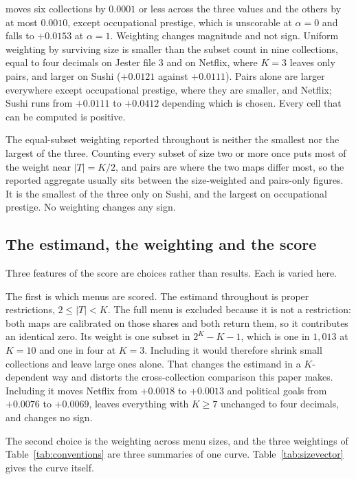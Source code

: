 \documentclass[11pt]{article}
\theoremstyle{italichead}
\begin{document}
\begin{table}[htbp]
{moves six collections by $0.0001$ or less across the three values and the others by at most
$0.0010$, except occupational prestige, which is unscorable at $\alpha = 0$ and falls to
$+0.0153$ at $\alpha = 1$. Weighting changes magnitude and not sign. Uniform weighting by
surviving size is smaller than the subset count in nine collections, equal to four decimals on
Jester file 3 and on Netflix, where $K = 3$ leaves only pairs, and larger on Sushi ($+0.0121$
against $+0.0111$). Pairs alone are larger everywhere except occupational prestige, where they
are smaller, and Netflix; Sushi runs from $+0.0111$ to $+0.0412$ depending which is chosen. Every
cell that can be computed is positive.}
\label{tab:conventions}
\end{table}

The equal-subset weighting reported throughout is neither the smallest nor the largest of the
three. Counting every subset of size two or more once puts most of the weight near
$|T| = K/2$, and pairs are where the two maps differ most, so the reported aggregate usually sits
between the size-weighted and pairs-only figures. It is the smallest of the three only on Sushi,
and the largest on occupational prestige. No weighting changes any sign.

\subsection{The estimand, the weighting and the score}
\label{sec:estimand}

Three features of the score are choices rather than results. Each is varied here.

The first is which menus are scored. The estimand throughout is proper restrictions,
$2 \le |T| < K$. The full menu is excluded because it is not a restriction: both maps are
calibrated on those shares and both return them, so it contributes an identical zero. Its weight
is one subset in $2^K - K - 1$, which is one in $1{,}013$ at $K = 10$ and one in four at $K = 3$.
Including it would therefore shrink small collections and leave large ones alone. That changes
the estimand in a $K$-dependent way and distorts the cross-collection comparison this paper
makes. Including it moves Netflix from $+0.0018$ to
$+0.0013$ and political goals from $+0.0076$ to $+0.0069$, leaves everything with $K \ge 7$
unchanged to four decimals, and changes no sign.

The second choice is the weighting across menu sizes, and the three weightings of
Table~\ref{tab:conventions} are three summaries of one curve. Table~\ref{tab:sizevector}
gives the curve itself.
\end{document}
